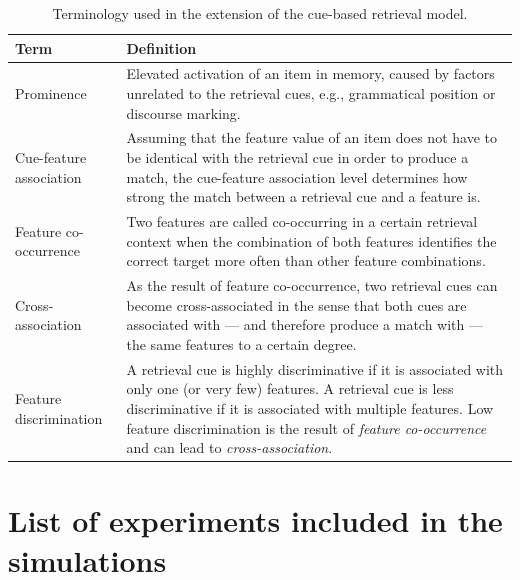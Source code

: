 \documentclass{cambridge7A}\usepackage[]{graphicx}\usepackage[]{color}
\begin{document}
\begin{subappendices}
\begin{table}[!htbp]
\begin{center}
\caption{Terminology used in the extension of the cue-based retrieval model.}\label{tab:definitionsEXT}
{\footnotesize
\begin{tabular}{p{4cm}p{6cm}}
\hline
Term                & Definition \\
\hline
Prominence          & Elevated activation of an item in memory, caused by factors unrelated to the retrieval cues, e.g., grammatical position or discourse marking. \\
Cue-feature association         & Assuming that the feature value of an item does not have to be identical with the retrieval cue in order to produce a match, the cue-feature association level determines how strong the match between a retrieval cue and a feature is.  \\
Feature co-occurrence  			& Two features are called co-occurring in a certain retrieval context when the combination of both features identifies the correct target more often than other feature combinations. \\
Cross-association          & As the result of feature co-occurrence, two retrieval cues can become cross-associated in the sense that both cues are associated with --- and therefore produce a match with --- the same features to a certain degree. \\
Feature discrimination  & A retrieval cue is highly discriminative if it is associated with only one (or very few) features. A retrieval cue is less discriminative if it is associated with multiple features. Low feature discrimination is the result of \emph{feature co-occurrence} and can lead to \emph{cross-association}. \\
\hline
\end{tabular}
}
\end{center}
\end{table}


\clearpage
\section{List of experiments included in the simulations}


\end{subappendices}
\end{document}
